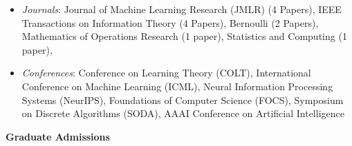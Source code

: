\documentclass[margin,centered]{res}
\newcommand\quelle[1]{{%
      \unskip\nobreak\hfil\penalty50
      \hskip2em\hbox{}\nobreak\hfil\emph{#1}%
      \parfillskip=0pt \finalhyphendemerits=0 \par}}
\begin{document}
\begin{resume}
\begin{itemize}\itemsep0em
  \item \emph{Journals}: Journal of Machine Learning Research (JMLR) (4 Papers), IEEE Transactions on Information Theory (4 Papers), Bernoulli (2 Papers), Mathematics of Operations Research (1 paper),  Statistics and Computing (1 paper), 
  \item \emph{Conferences}: Conference on Learning Theory (COLT), International Conference on Machine Learning (ICML), Neural Information Processing Systems (NeurIPS), Foundations of Computer Science (FOCS), Symposium on Discrete Algorithms (SODA), AAAI Conference on Artificial Intelligence
\end{itemize}

\textbf{Graduate Admissions}




\end{resume}
\end{document}
